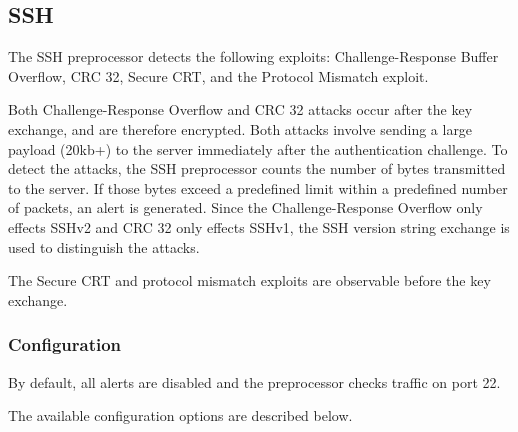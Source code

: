 \documentclass[english]{report}
\begin{document}
\subsection{SSH}
\label{sub:ssh}

The SSH preprocessor detects the following exploits: Challenge-Response Buffer
Overflow, CRC 32, Secure CRT, and the Protocol Mismatch exploit.

Both Challenge-Response Overflow and CRC 32 attacks occur after the key
exchange, and are therefore encrypted.  Both attacks involve sending a large
payload (20kb+) to the server immediately after the authentication challenge.
To detect the attacks, the SSH preprocessor counts the number of bytes
transmitted to the server.  If those bytes exceed a predefined limit within a
predefined number of packets, an alert is generated.  Since the
Challenge-Response Overflow only effects SSHv2 and CRC 32 only effects SSHv1,
the SSH version string exchange is used to distinguish the attacks.

The Secure CRT and protocol mismatch exploits are observable before the key
exchange.

\subsubsection{Configuration}

By default, all alerts are disabled and the preprocessor checks traffic on port
22.

The available configuration options are described below.
\end{document}

